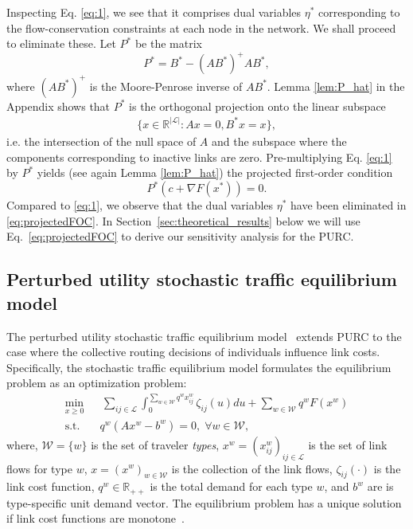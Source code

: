 \documentclass[a4paper,11pt]{article}
\begin{document}
Inspecting Eq. \eqref{eq:1}, we see that it comprises dual variables $\eta^*$ corresponding to the flow-conservation constraints at each node in the network.  We shall proceed to eliminate these. Let ${P^*}$ be the matrix 
\begin{equation*}\label{eq:Pstar}
{P^*}={B^*}-(AB^*)^+A B^*,
\end{equation*}%
where $(A{B^*})^{+}$ is the Moore-Penrose inverse of $A B^*$. Lemma \ref{lem:P_hat} in the Appendix shows that $ P^*$ is the orthogonal projection onto the linear subspace
\begin{eqnarray}\label{eq:subspace}
\{ x\in \mathbb R^{|\mathcal{L}|}:A x =0, B^* x =x\},
\end{eqnarray}
i.e. the intersection of the null space of $A$ and the subspace where the components corresponding to inactive links are zero. Pre-multiplying Eq. \eqref{eq:1} by ${P^*}$ yields (see again Lemma \ref{lem:P_hat}) the projected first-order condition
\begin{equation}\label{eq:projectedFOC}
{P^*}(c+\nabla F(x^*))=0.
\end{equation}
Compared to \eqref{eq:1}, we observe that the dual variables $\eta^*$ have been eliminated in \eqref{eq:projectedFOC}. In Section~\ref{sec:theoretical_results} below we will use Eq.~\eqref{eq:projectedFOC} to derive our sensitivity analysis for the PURC.

\subsection{Perturbed utility stochastic traffic equilibrium model}
The perturbed utility stochastic traffic equilibrium model~\citep{yao_perturbed_2024} extends PURC to the case where the collective routing decisions of individuals influence link costs. Specifically, the stochastic traffic equilibrium model formulates the equilibrium problem as an optimization problem:
\begin{subequations}
\label{eq:PURC_SUE}
\begin{align}
\min_{x \geq 0}&\, \sum_{{ij} \in \mathcal{L}}\int_0^{\sum_{w\in\mathcal{W}} q^w x_{ij}^w} \zeta _{ij}(u)du+ \sum_{w\in\mathcal{W}} q^w F(x^w) \\
\text{s.t.}\quad & q^w (Ax^w - b^w) = 0, \; \forall w \in \mathcal{W},
\end{align}
\end{subequations}
where, $\mathcal{W} = \{w\}$ is the set of traveler \textit{types}, $x^w = (x_{ij}^w)_{{ij}\in\mathcal{L}}$ is the set of link flows for type $w$,  $x= (x^w)_{w \in \mathcal{W}}$ is the collection of the link flows, $\zeta_{ij}(\cdot)$ is the link cost function, $q^w \in \mathbb{R}_{++}$ is the total demand for each type $w$, and $b^w$ are is type-specific unit demand vector. The equilibrium problem has a unique solution if link cost functions are monotone~\citep{yao_perturbed_2024}.
\end{document}
